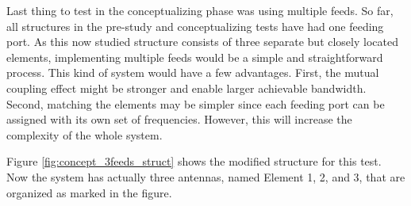 Last thing to test in the conceptualizing phase was using multiple feeds. So far, all structures in the pre-study and conceptualizing tests have had one feeding port. As this now studied structure consists of three separate but closely located elements, implementing multiple feeds would be a simple and straightforward process. This kind of system would have a few advantages. First, the mutual coupling effect might be stronger and enable larger achievable bandwidth. Second, matching the elements may be simpler since each feeding port can be assigned with its own set of frequencies. However, this will increase the complexity of the whole system.

Figure \ref{fig:concept_3feeds_struct} shows the modified structure for this test. Now the system has actually three antennas, named Element 1, 2, and 3, that are organized as marked in the figure.

